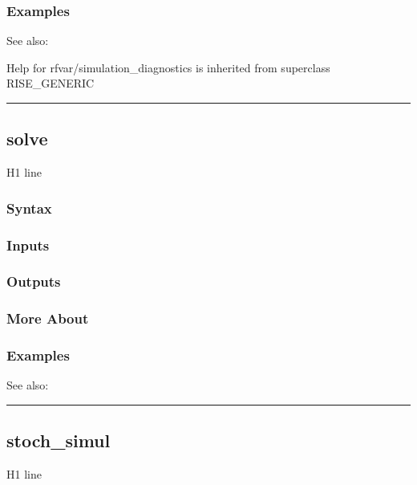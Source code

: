 \documentclass[letterpaper,10pt,english]{sphinxmanual}
\begin{document}
\subsubsection{Examples}
\label{classes/models/@rfvar/rfvar:id126}
See also:

Help for rfvar/simulation\_diagnostics is inherited from superclass RISE\_GENERIC


\bigskip\hrule{}\bigskip



\subsection{solve}
\label{classes/models/@rfvar/rfvar:id127}\label{classes/models/@rfvar/rfvar:solve}
H1 line


\subsubsection{Syntax}
\label{classes/models/@rfvar/rfvar:id128}

\subsubsection{Inputs}
\label{classes/models/@rfvar/rfvar:id129}

\subsubsection{Outputs}
\label{classes/models/@rfvar/rfvar:id130}

\subsubsection{More About}
\label{classes/models/@rfvar/rfvar:id131}

\subsubsection{Examples}
\label{classes/models/@rfvar/rfvar:id132}
See also:


\bigskip\hrule{}\bigskip



\subsection{stoch\_simul}
\label{classes/models/@rfvar/rfvar:id133}\label{classes/models/@rfvar/rfvar:stoch-simul}
H1 line
\end{document}
